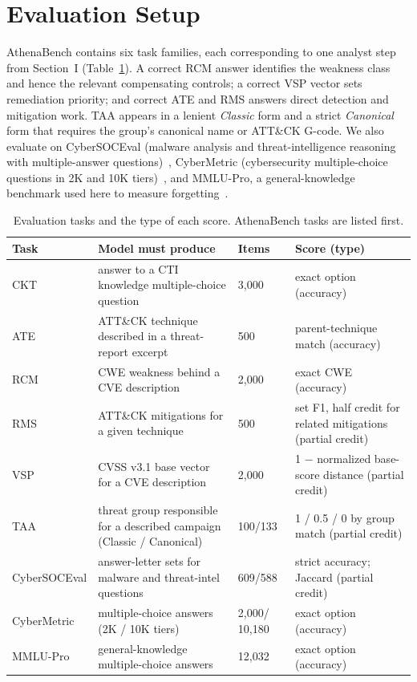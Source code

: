 \documentclass[conference]{IEEEtran}
\begin{document}
\section{Evaluation Setup}\label{sec:eval}
AthenaBench contains six task families, each corresponding to one analyst step from Section~I (Table~\ref{tab:eval}). A correct RCM answer identifies the weakness class and hence the relevant compensating controls; a correct VSP vector sets remediation priority; and correct ATE and RMS answers direct detection and mitigation work. TAA appears in a lenient \emph{Classic} form and a strict \emph{Canonical} form that requires the group's canonical name or ATT\&CK G-code. We also evaluate on CyberSOCEval (malware analysis and threat-intelligence reasoning with multiple-answer questions)~\cite{deason2025cybersoceval}, CyberMetric (cybersecurity multiple-choice questions in 2K and 10K tiers)~\cite{tihanyi2024cybermetric}, and MMLU-Pro, a general-knowledge benchmark used here to measure forgetting~\cite{wang2024mmlupro}.

\begin{table}[t]
\caption{Evaluation tasks and the type of each score. AthenaBench tasks are listed first.}
\label{tab:eval}
\centering
\scriptsize
\setlength{\tabcolsep}{2.5pt}
\begin{tabular}{@{}p{}p{}p{}p{}@{}}
\toprule
Task & Model must produce & Items & Score (type) \\
\midrule
CKT & answer to a CTI knowledge multiple-choice question & 3,000 & exact option (accuracy) \\
ATE & ATT\&CK technique described in a threat-report excerpt & 500 & parent-technique match (accuracy) \\
RCM & CWE weakness behind a CVE description & 2,000 & exact CWE (accuracy) \\
RMS & ATT\&CK mitigations for a given technique & 500 & set F1, half credit for related mitigations (partial credit) \\
VSP & CVSS v3.1 base vector for a CVE description & 2,000 & 1 $-$ normalized base-score distance (partial credit) \\
TAA & threat group responsible for a described campaign (Classic / Canonical) & 100/133 & 1 / 0.5 / 0 by group match (partial credit) \\
\midrule
Cyber\-SOC\-Eval & answer-letter sets for malware and threat-intel questions & 609/588 & strict accuracy; Jaccard (partial credit) \\
CyberMetric & multiple-choice answers (2K / 10K tiers) & 2,000/ 10,180 & exact option (accuracy) \\
MMLU-Pro & general-knowledge multiple-choice answers & 12,032 & exact option (accuracy) \\
\bottomrule
\end{tabular}
\end{table}
\end{document}

